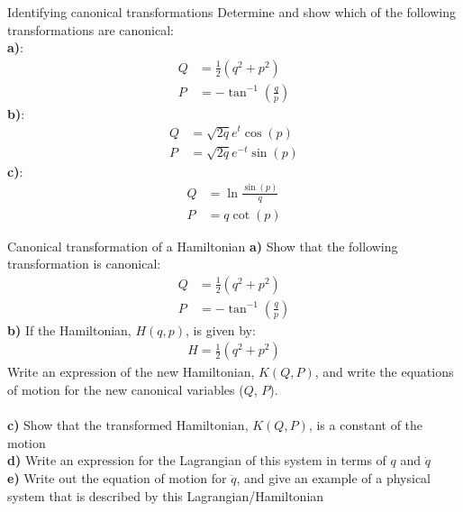 \begin{problem}{Identifying canonical transformations}
Determine and show which of the following transformations are canonical:\\
\textbf{a)}:
\begin{align*}
Q&=\frac{1}{2}(q^2+p^2)\\
P&=-\tan^{-1}(\frac{q}{p})
\end{align*}
\textbf{b)}:
\begin{align*}
Q&=\sqrt{2q}e^t \cos(p)\\
P&=\sqrt{2q}e^{-t}\sin(p)
\end{align*}
\textbf{c)}:
\begin{align*}
Q&=\ln\frac{\sin(p)}{q}\\
P&=q\cot(p)
\end{align*}
\label{prob_CT_4}
\end{problem}

\begin{problem}{Canonical transformation of a Hamiltonian}
\textbf{a)} Show that the following transformation is canonical:
\begin{align*}
Q&=\frac{1}{2}(q^2+p^2)\\
P&=-\tan^{-1}(\frac{q}{p})
\end{align*}
\textbf{b)} If the Hamiltonian, $H(q,p)$, is given by:
\begin{align*}
H=\frac{1}{2}(q^2+p^2)
\end{align*}
Write an expression of the new Hamiltonian, $K(Q,P)$, and write the equations of motion for the new canonical variables ($Q$, $P$).\\\\
\textbf{c)} Show that the transformed Hamiltonian, $K(Q,P)$, is a constant of the motion\\
\textbf{d)} Write an expression for the Lagrangian of this system in terms of $q$ and $\dot q$\\
\textbf{e)} Write out the equation of motion for $\ddot q$, and give an example of a physical system that is described by this Lagrangian/Hamiltonian
\label{prob_CT_5}
\end{problem}